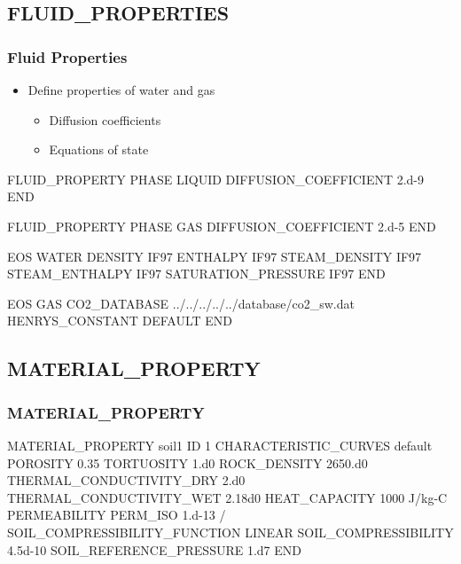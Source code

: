 \documentclass{beamer}
\begin{document}
\subsection{FLUID\_PROPERTIES}
\begin{frame}\frametitle{Fluid Properties}

\begin{itemize}
  \item Define properties of water and gas
  \begin{itemize}
    \item Diffusion coefficients
    \item Equations of state
  \end{itemize}
\end{itemize}

\begin{semiverbatim}
FLUID_PROPERTY
  PHASE LIQUID
  DIFFUSION_COEFFICIENT 2.d-9
END

FLUID_PROPERTY
  PHASE GAS
  DIFFUSION_COEFFICIENT 2.d-5
END

\newpage

EOS WATER
  DENSITY IF97
  ENTHALPY IF97
  STEAM_DENSITY IF97
  STEAM_ENTHALPY IF97
  SATURATION_PRESSURE IF97
END

EOS GAS
  CO2_DATABASE ../../../../../database/co2_sw.dat
  HENRYS_CONSTANT DEFAULT
END

\end{semiverbatim}

\end{frame}
\subsection{MATERIAL\_PROPERTY}

\begin{frame}\frametitle{MATERIAL\_PROPERTY}

\begin{semiverbatim}
MATERIAL_PROPERTY soil1
  ID 1
  CHARACTERISTIC_CURVES default
  POROSITY 0.35
  TORTUOSITY 1.d0
  ROCK_DENSITY 2650.d0
  THERMAL_CONDUCTIVITY_DRY 2.d0
  THERMAL_CONDUCTIVITY_WET 2.18d0
  HEAT_CAPACITY 1000 J/kg-C
  PERMEABILITY
    PERM_ISO 1.d-13
  /
  SOIL_COMPRESSIBILITY_FUNCTION LINEAR
  SOIL_COMPRESSIBILITY 4.5d-10
  SOIL_REFERENCE_PRESSURE 1.d7
END
\end{semiverbatim}

\end{frame}
\end{document}
